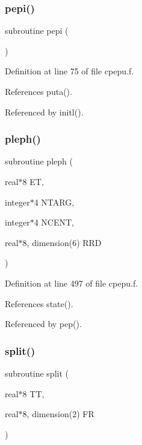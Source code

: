 \mbox{\label{cpepu_8f_ab45e4e9029c53c9b090b899afccef340}} 
\subsubsection{\texorpdfstring{pepi()}{pepi()}}
{\footnotesize\ttfamily subroutine pepi (\begin{DoxyParamCaption}{ }\end{DoxyParamCaption})}



Definition at line 75 of file cpepu.\+f.



References puta().



Referenced by initl().

\mbox{\label{cpepu_8f_aedc7e0a9526045bd01307271228e14a3}} 
\subsubsection{\texorpdfstring{pleph()}{pleph()}}
{\footnotesize\ttfamily subroutine pleph (\begin{DoxyParamCaption}\item[{real$\ast$8}]{ET,  }\item[{integer$\ast$4}]{N\+T\+A\+RG,  }\item[{integer$\ast$4}]{N\+C\+E\+NT,  }\item[{real$\ast$8, dimension(6)}]{R\+RD }\end{DoxyParamCaption})}



Definition at line 497 of file cpepu.\+f.



References state().



Referenced by pep().

\mbox{\label{cpepu_8f_aab78822781152ab32cf6414e6baf07ff}} 
\subsubsection{\texorpdfstring{split()}{split()}}
{\footnotesize\ttfamily subroutine split (\begin{DoxyParamCaption}\item[{real$\ast$8}]{TT,  }\item[{real$\ast$8, dimension(2)}]{FR }\end{DoxyParamCaption})}



